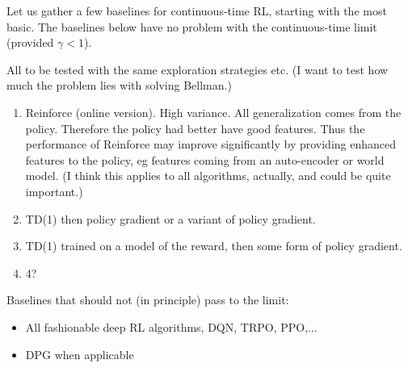 \documentclass[11pt,a4paper]{article}
\begin{document}
Let us gather a few baselines for continuous-time RL, starting with the
most basic. The baselines below have no problem with the continuous-time
limit (provided $\gamma<1$).

All to be tested with the same exploration strategies etc. (I want to
test how much the problem lies with solving Bellman.)

\begin{enumerate}

\item Reinforce (online version). High variance. All generalization comes
from the policy. Therefore the policy had better have good features. Thus
the performance of Reinforce may improve significantly by providing
enhanced features to the policy, eg features coming from an auto-encoder
or world model. (I think this applies to all algorithms, actually, and
could be quite important.)

\item TD(1) then policy gradient or a variant of policy gradient.

\item TD(1) trained on a model of the reward, then some form of policy
gradient.

\item 4?
\end{enumerate}

Baselines that should not (in principle) pass to the limit:
\begin{itemize}
\item All fashionable deep RL algorithms, DQN, TRPO, PPO,...
\item DPG when applicable
\end{itemize}
\end{document}
